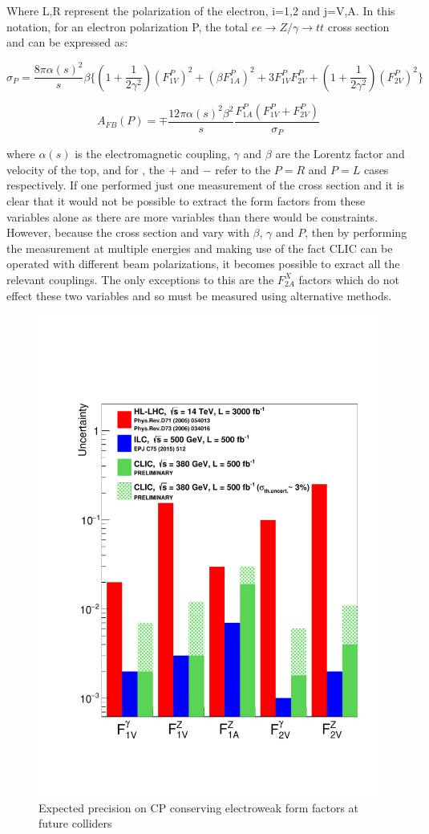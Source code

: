 Where L,R represent the polarization of the electron, i=1,2 and j=V,A. In this notation, for an electron polarization P, the total $ee\rightarrow Z/\gamma\rightarrow tt$ cross section and \afb can be expressed as:

\begin{equation}
\sigma_P = \frac{8\pi\alpha(s)^2}{s}\beta \{(1 + \frac{1}{2\gamma^2})(F_{1V}^P)^2 +(\beta F_{1A}^P)^2 +3F_{1V}^P F_{2V}^P + (1 + \frac{1}{2\gamma^2})(F_{2V}^P)^2\}
\end{equation}

\begin{equation}
\label{eq:afbFormFactors}
A_{FB}(P) = \mp \frac{12\pi\alpha(s)^2 \beta^2}{s}\frac{F_{1A}^P(F_{1V}^P +F_{2V}^P)}{\sigma_P}
\end{equation}

where $\alpha(s)$  is the electromagnetic coupling, $\gamma$ and $\beta$ are the Lorentz factor and velocity of the top, and for , the $+$ and $-$ refer to the $P=R$ and $P=L$ cases respectively. If one performed just one measurement of the cross section and \afb it is clear that it would not be possible to extract the form factors from these variables alone as there are more variables than there would be constraints. However, because the cross section and \afb vary with $\beta$, $\gamma$ and $P$, then by performing the measurement at multiple energies and making use of the fact \ac{CLIC} can be operated with different beam polarizations, it becomes possible to exract all the relevant couplings. The only exceptions to this are the $F_{2A}^X$ factors which do not effect these two variables and so must be measured using alternative methods. 

\begin{figure}
\centering
\includegraphics[width=0.45\linewidth]{Theory/fig/FormFactorsTopCLIC380.pdf}
\caption[Expected precision on CP conserving electroweak form factors at future colliders]{Expected precision on CP conserving electroweak form factors at future colliders \cite{CLIC:2016zwp}}
\label{fig:CPConserving}
\end{figure}

